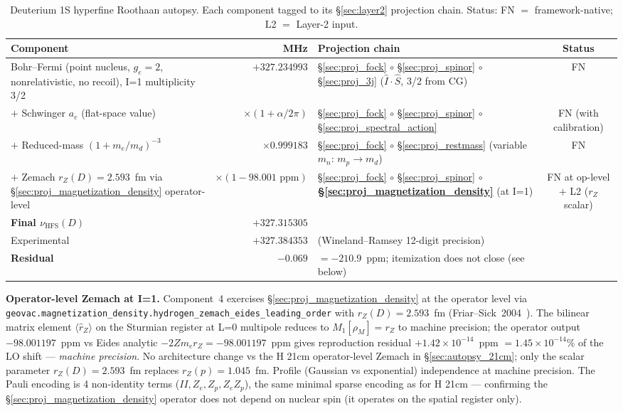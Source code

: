 \documentclass[11pt]{article}
\begin{document}
\begin{table}[h]
\centering\small
\begin{tabular}{p{4.5cm} r p{6cm} c}
\toprule
Component & MHz & Projection chain & Status \\
\midrule
Bohr--Fermi (point nucleus, $g_e=2$, nonrelativistic, no recoil), I=1
multiplicity 3/2 & $+327.234993$ &
\S\ref{sec:proj_fock} $\circ$ \S\ref{sec:proj_spinor} $\circ$
\S\ref{sec:proj_3j} ($\hat{I}\cdot\hat{S}$, 3/2 from CG) & FN \\
$+$ Schwinger $a_e$ (flat-space value) &
$\times (1+\alpha/2\pi)$ &
\S\ref{sec:proj_fock} $\circ$ \S\ref{sec:proj_spinor} $\circ$
\S\ref{sec:proj_spectral_action} & FN (with calibration) \\
$+$ Reduced-mass $(1+m_e/m_d)^{-3}$ & $\times 0.999183$ &
\S\ref{sec:proj_fock} $\circ$ \S\ref{sec:proj_restmass} (variable
$m_n$: $m_p \to m_d$) & FN \\
$+$ Zemach $r_Z(D)=2.593$~fm via \S\ref{sec:proj_magnetization_density}
operator-level & $\times (1 - 98.001 \text{~ppm})$ &
\S\ref{sec:proj_fock} $\circ$ \S\ref{sec:proj_spinor} $\circ$
\textbf{\S\ref{sec:proj_magnetization_density}} (at I=1) & FN at op-level
$+$ L2 ($r_Z$ scalar) \\
\midrule
\textbf{Final $\nu_\text{HFS}(D)$} & $+327.315305$ & & \\
Experimental & $+327.384353$ & (Wineland--Ramsey 12-digit precision) & \\
\textbf{Residual} & $-0.069$ & $= -210.9$~ppm; itemization does not
close (see below) & \\
\bottomrule
\end{tabular}
\caption{Deuterium 1S hyperfine Roothaan autopsy.  Each component
tagged to its \S\ref{sec:layer2} projection chain. Status: FN $=$
framework-native; L2 $=$ Layer-2 input.}
\label{tab:autopsy_d_hfs}
\end{table}

\textbf{Operator-level Zemach at I=1.}  Component~4 exercises
\S\ref{sec:proj_magnetization_density} at the operator level via
\texttt{geovac.magnetization\_density.hydrogen\_zemach\_eides\_leading\_order}
with $r_Z(D) = 2.593$~fm (Friar--Sick~2004~\cite{friar_sick2004}).  The bilinear matrix
element $\langle\hat{r}_Z\rangle$ on the Sturmian register at L=0
multipole reduces to $M_1[\rho_M] = r_Z$ to machine precision; the
operator output $-98.001197$~ppm vs Eides analytic $-2 Z m_e r_Z =
-98.001197$~ppm gives reproduction residual
$+1.42 \times 10^{-14}$~ppm $= 1.45 \times 10^{-14}\%$ of the LO shift
--- \emph{machine precision}.  No architecture change vs the H 21cm
operator-level Zemach in \S\ref{sec:autopsy_21cm}; only the scalar
parameter $r_Z(D) = 2.593$~fm replaces $r_Z(p) = 1.045$~fm.  Profile
(Gaussian vs exponential) independence at machine precision.  The
Pauli encoding is 4 non-identity terms ($II, Z_e, Z_p, Z_e Z_p$),
the same minimal sparse encoding as for H 21cm --- confirming the
\S\ref{sec:proj_magnetization_density} operator does not depend on
nuclear spin (it operates on the spatial register only).
\end{document}
